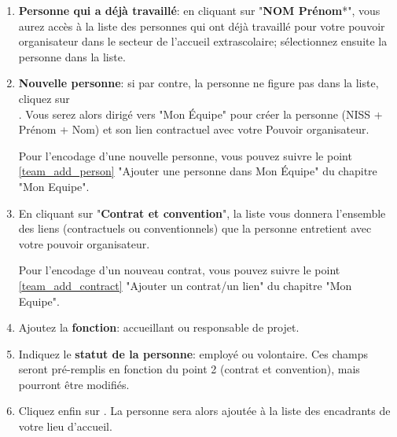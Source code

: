 \begin{enumerate}
    \item \textbf{Personne qui a déjà travaillé}: en cliquant sur "\textbf{NOM Prénom}*", vous aurez accès à la liste des personnes qui ont déjà travaillé pour votre pouvoir organisateur dans le secteur de l'accueil extrascolaire;  sélectionnez ensuite la personne dans la liste. 
    \item \textbf{Nouvelle personne}: si par contre, la personne ne figure pas dans la liste, cliquez sur \\. Vous serez alors dirigé vers "Mon Équipe" pour créer la personne (NISS + Prénom + Nom) et son lien contractuel avec votre Pouvoir organisateur. 
    \begin{info}
     Pour l'encodage d'une nouvelle personne, vous pouvez suivre le point \ref{team_add_person} "Ajouter une personne dans Mon Équipe" du chapitre "Mon Equipe".
    \end{info}
    
    \item En cliquant sur "\textbf{Contrat et convention}", la liste vous donnera l'ensemble des liens (contractuels ou conventionnels) que la personne entretient avec votre pouvoir organisateur. 
    \begin{info}
     Pour l'encodage d'un nouveau contrat, vous pouvez suivre le point \ref{team_add_contract} "Ajouter un contrat/un lien" du chapitre "Mon Equipe".
    \end{info}    

    
    \item Ajoutez la \textbf{fonction}: accueillant ou responsable de projet. 
       
    \item Indiquez le \textbf{statut de la personne}: employé ou volontaire. Ces champs seront pré-remplis en fonction du point 2 (contrat et convention), mais pourront être modifiés. 
    \item Cliquez enfin sur . La personne sera alors ajoutée à la liste des encadrants de votre lieu d'accueil.
\end{enumerate}

\vspace*{4mm}





